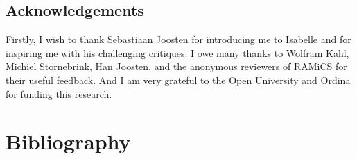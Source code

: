 \documentclass{elsarticle}
\begin{document}
\subsection{Acknowledgements}
\label{sct:Acknowledgements}
	Firstly, I wish to thank Sebastiaan Joosten for introducing me to Isabelle and for inspiring me with his challenging critiques.
	I owe many thanks to Wolfram Kahl, Michiel Stornebrink, Han Joosten, and the anonymous reviewers of RAMiCS for their useful feedback.
	And I am very grateful to the Open University and Ordina for funding this research.

\section{Bibliography}


\end{document}
